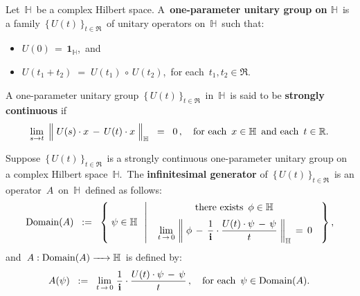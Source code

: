 \vskip 0.5cm
\begin{definition}
\mbox{}
\vskip 0.05cm
\noindent
Let \,$\mathbb{H}$\, be a complex Hilbert space.
A \,\textbf{one-parameter unitary group on $\mathbb{H}$}\,
is a family \,$\{\,U(t)\,\}_{t\in\Re}$\, of unitary operators on \,$\mathbb{H}$\,
such that:
\begin{itemize}
\item
	$U(0) \,=\, \mathbf{1}_{\mathbb{H}}$,\, and
\item
	$U(t_{1}+t_{2}) \;=\; U(t_{1}) \,\circ\, U(t_{2})$,\,
	for each \,$t_{1}, t_{2} \in \Re$.\,
\end{itemize}
A one-parameter unitary group \,$\{\,U(t)\,\}_{t\in\Re}$\, in \,$\mathbb{H}$\,
is said to be \textbf{strongly continuous} if
\begin{equation*}
\underset{s \rightarrow t}{\lim}\;
\left\Vert\;
	U(s) \cdot x
	\,\overset{{\color{white}.}}{-}\,
	U(t) \cdot x
	\;\right\Vert_{\mathbb{H}}
\;\;=\;\;
	0\,,
\quad
\textnormal{for each \,$x \in \mathbb{H}$\, and each \,$t \in \Re$.\,}
\end{equation*}
\end{definition}

\vskip 0.3cm
\begin{definition}
\mbox{}
\vskip 0.05cm
\noindent
Suppose
\,$\{\,U(t)\,\}_{t\in\Re}$\,
is a strongly continuous one-parameter unitary group on a complex Hilbert space \,$\mathbb{H}$.\,
The \textbf{infinitesimal generator} of
\,$\{\,U(t)\,\}_{t\in\Re}$\,
is an operator
\,$A$\, on \,$\mathbb{H}$\, defined as follows:
\begin{equation*}
\textnormal{Domain}(A)
\;\; := \;\;
	\left\{\;
		\psi \in \mathbb{H}
		\;\;\left\vert\;\;
		\begin{array}{c}
		\underset{{\color{white}1}}{\textnormal{there exists \,$\phi \in \mathbb{H}$\,}}
		\\
		\underset{t\,\rightarrow\,0}{\lim}\,
		\left\Vert\;
			\phi
			\,-\,
			\dfrac{1}{\i}\cdot\dfrac{
			U(t) \cdot \psi \,-\, \psi
			}{t}
			\;\right\Vert_{\mathbb{H}}
		\,=\,0
		\end{array}
		\right.
		\;\right\},
\end{equation*}
and \,$A : \textnormal{Domain}(A) \xrightarrow{{\color{white}222}} \mathbb{H}$\,
is defined by:
\begin{equation*}
A(\psi)
\;\; := \;\;
	\underset{t\,\rightarrow\,0}{\lim}\;\dfrac{1}{\mathbf{i}}\cdot\dfrac{
		U(t) \cdot \psi \,-\, \psi
		}{t}\,,
\quad
\textnormal{for each \,$\psi \in \textnormal{Domain}(A)$.\,}
\end{equation*}
\end{definition}

